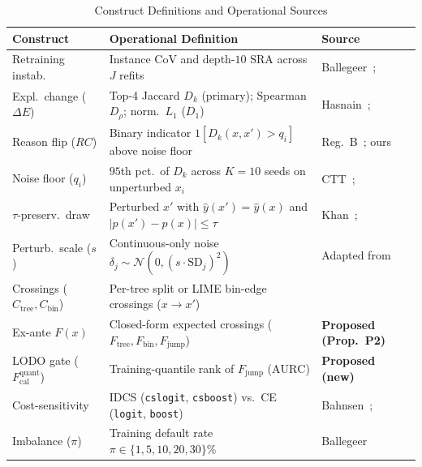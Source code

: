 \documentclass[conference]{IEEEtran}
\begin{document}
\begin{table}[!t]
\centering
\caption{Construct Definitions and Operational Sources}
\label{tab:constructs}
\scriptsize
\renewcommand{\arraystretch}{0.76}
\setlength{\tabcolsep}{2.4pt}
\begin{tabular}{@{}p{2.05cm}p{3.75cm}p{2.2cm}@{}}
\toprule
\textbf{Construct} & \textbf{Operational Definition} & \textbf{Source} \\
\midrule
Retraining instab. & Instance $\mathrm{CoV}$ and depth-$10$ $\mathrm{SRA}$ across $J$ refits & Ballegeer~\cite{ballegeer2025}; \cite{ekstrom2019} \\
Expl.\ change ($\Delta E$) & Top-4 Jaccard $D_k$ (primary); Spearman $D_\rho$; norm.\ $L_1$ ($D_1$) & Hasnain~\cite{hasnain2026}; \cite{lin2025shap} \\
Reason flip ($RC$) & Binary indicator $1[D_k(x,x') > q_i]$ above noise floor & Reg.\ B~\cite{regb_cfpb}; ours \\
Noise floor ($q_i$) & $95$th pct.\ of $D_k$ across $K{=}10$ seeds on unperturbed $x_i$ & CTT~\cite{novick1966}; \cite{kelodjou2024} \\
$\tau$-preserv.\ draw & Perturbed $x'$ with $\hat{y}(x')=\hat{y}(x)$ and $|p(x')-p(x)|\le\tau$ & Khan~\cite{khan2024}; \cite{tolay2026} \\
Perturb.\ scale ($s$) & Continuous-only noise $\delta_j \sim \mathcal{N}(0, (s\cdot\mathrm{SD}_j)^2)$ & Adapted from~\cite{tolay2026} \\
Crossings ($C_{\mathrm{tree}},C_{\mathrm{bin}}$) & Per-tree split or LIME bin-edge crossings ($x{\to}x'$) & \cite{pala2024,breeden2026} \\
Ex-ante $F(x)$ & Closed-form expected crossings ($F_{\mathrm{tree}}, F_{\mathrm{bin}}, F_{\mathrm{jump}}$) & \textbf{Proposed (Prop.~P2)} \\
LODO gate ($F_{\mathrm{cal}}^{\mathrm{quant}}$) & Training-quantile rank of $F_{\mathrm{jump}}$ ($\mathrm{AURC}$) & \textbf{Proposed (new)} \\
Cost-sensitivity & IDCS (\texttt{cslogit}, \texttt{csboost}) vs.\ CE (\texttt{logit}, \texttt{boost}) & Bahnsen~\cite{bahnsen2014}; \cite{hoppner2022} \\
Imbalance ($\pi$) & Training default rate $\pi \in \{1, 5, 10, 20, 30\}\%$ & Ballegeer~\cite{ballegeer2025} \\
\bottomrule
\end{tabular}
\end{table}

\end{document}
